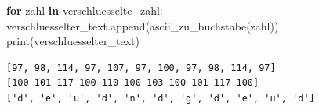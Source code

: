 \documentclass[
  letterpaper,
  DIV=11,
  numbers=noendperiod]{scrreprt}
\newenvironment{Shaded}{\begin{snugshade}}{\end{snugshade}}
\newcommand{\BuiltInTok}[1]{\textcolor[rgb]{0.00,0.23,0.31}{#1}}
\newcommand{\ControlFlowTok}[1]{\textcolor[rgb]{0.00,0.23,0.31}{\textbf{#1}}}
\newcommand{\KeywordTok}[1]{\textcolor[rgb]{0.00,0.23,0.31}{\textbf{#1}}}
\newcommand{\NormalTok}[1]{\textcolor[rgb]{0.00,0.23,0.31}{#1}}
\begin{document}
\begin{tcolorbox}
\begin{tcolorbox}
\begin{Shaded}
\begin{Highlighting}[]
\ControlFlowTok{for}\NormalTok{ zahl }\KeywordTok{in}\NormalTok{ verschluesselte\_zahl:    }
\NormalTok{    verschluesselter\_text.append(ascii\_zu\_buchstabe(zahl))}
\BuiltInTok{print}\NormalTok{(verschluesselter\_text)}
\end{Highlighting}
\end{Shaded}

\begin{verbatim}
[97, 98, 114, 97, 107, 97, 100, 97, 98, 114, 97]
[100 101 117 100 110 100 103 100 101 117 100]
['d', 'e', 'u', 'd', 'n', 'd', 'g', 'd', 'e', 'u', 'd']
\end{verbatim}

\end{tcolorbox}

\end{tcolorbox}
\end{document}
